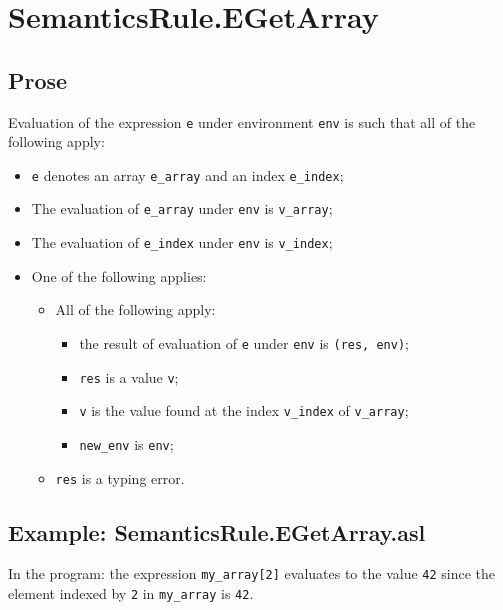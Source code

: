 \documentclass{book}
\begin{document}

\section{SemanticsRule.EGetArray \label{sec:SemanticsRule.EGetArray}}

  \subsection{Prose}
  Evaluation of the expression \texttt{e} under environment \texttt{env} is
  such that all of the following apply:
  \begin{itemize}
  \item \texttt{e} denotes an array \texttt{e\_array} and an index \texttt{e\_index};
  \item The evaluation of \texttt{e\_array} under \texttt{env} is \texttt{v\_array};
  \item The evaluation of \texttt{e\_index} under \texttt{env} is \texttt{v\_index};
  \item One of the following applies:
        \begin{itemize}
        \item All of the following apply:
          \begin{itemize}
          \item the result of evaluation of \texttt{e} under \texttt{env} is \texttt{(res, env)};
          \item \texttt{res} is a value \texttt{v};
          \item \texttt{v} is the value found at the index \texttt{v\_index} of \texttt{v\_array};
          \item \texttt{new\_env} is \texttt{env};
          \end{itemize}

        \item \texttt{res} is a typing error.
        \end{itemize}
  \end{itemize}

  \subsection{Example: SemanticsRule.EGetArray.asl}
    In the program:
    the expression \texttt{my\_array[2]} evaluates to the value \texttt{42} since the element
    indexed by \texttt{2} in \texttt{my\_array} is \texttt{42}.
\end{document}
